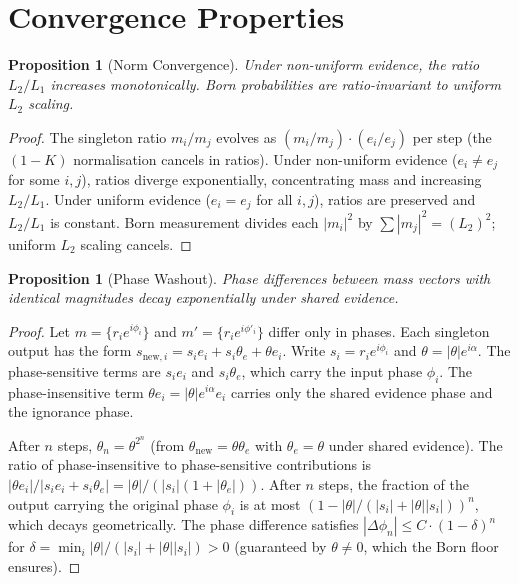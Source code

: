 \documentclass[11pt,a4paper]{article}
\newtheorem{proposition}[theorem]{Proposition}
\theoremstyle{definition}
\theoremstyle{remark}
\begin{document}
\section{Convergence Properties}\label{sec:convergence}

\begin{proposition}[Norm Convergence]\label{prop:norm}
Under non-uniform evidence, the ratio $L_2/L_1$ increases monotonically. Born probabilities are ratio-invariant to uniform $L_2$ scaling.
\end{proposition}

\begin{proof}
The singleton ratio $m_i/m_j$ evolves as $(m_i/m_j)\cdot(e_i/e_j)$ per step (the $(1-K)$ normalisation cancels in ratios). Under non-uniform evidence ($e_i\neq e_j$ for some $i,j$), ratios diverge exponentially, concentrating mass and increasing $L_2/L_1$. Under uniform evidence ($e_i=e_j$ for all $i,j$), ratios are preserved and $L_2/L_1$ is constant. Born measurement divides each $|m_i|^2$ by $\sum|m_j|^2=(L_2)^2$; uniform $L_2$ scaling cancels.
\end{proof}

\begin{proposition}[Phase Washout]\label{prop:washout}
Phase differences between mass vectors with identical magnitudes decay exponentially under shared evidence.
\end{proposition}

\begin{proof}
Let $m=\{r_ie^{i\phi_i}\}$ and $m'=\{r_ie^{i\phi'_i}\}$ differ only in phases. Each singleton output has the form $s_{\mathrm{new},i}=s_ie_i+s_i\theta_e+\theta e_i$. Write $s_i=r_ie^{i\phi_i}$ and $\theta=|\theta|e^{i\alpha}$. The phase-sensitive terms are $s_ie_i$ and $s_i\theta_e$, which carry the input phase $\phi_i$. The phase-insensitive term $\theta e_i=|\theta|e^{i\alpha}e_i$ carries only the shared evidence phase and the ignorance phase.

After $n$ steps, $\theta_n=\theta^{2^n}$ (from $\theta_{\mathrm{new}}=\theta\theta_e$ with $\theta_e=\theta$ under shared evidence). The ratio of phase-insensitive to phase-sensitive contributions is $|\theta e_i|/|s_ie_i+s_i\theta_e|=|\theta|/(|s_i|(1+|\theta_e|))$. After $n$ steps, the fraction of the output carrying the original phase $\phi_i$ is at most $(1-|\theta|/(|s_i|+|\theta||s_i|))^n$, which decays geometrically. The phase difference satisfies $|\Delta\phi_n|\leq C\cdot(1-\delta)^n$ for $\delta=\min_i|\theta|/(|s_i|+|\theta||s_i|)>0$ (guaranteed by $\theta\neq 0$, which the Born floor ensures).
\end{proof}
\end{document}

